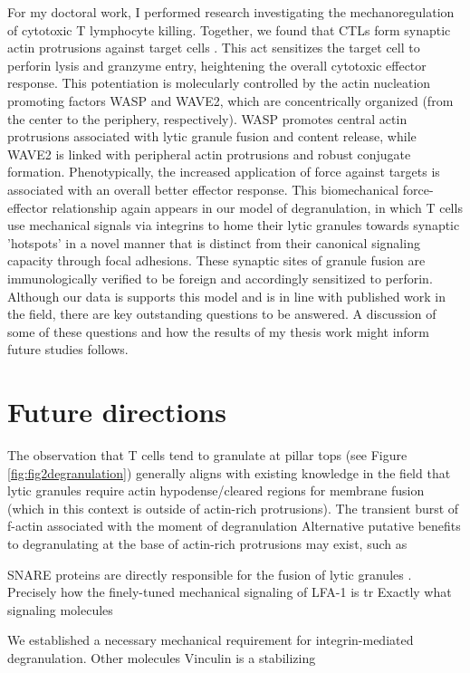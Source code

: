 For my doctoral work, I performed research investigating the mechanoregulation of cytotoxic T lymphocyte killing. Together, we found that CTLs form synaptic actin protrusions against target cells \cite{Tamzalit2018}. This act sensitizes the target cell to perforin lysis and granzyme entry, heightening the overall cytotoxic effector response. This potentiation is molecularly controlled by the actin nucleation promoting factors WASP and WAVE2, which are concentrically organized (from the center to the periphery, respectively). WASP promotes central actin protrusions associated with lytic granule fusion and content release, while WAVE2 is linked with peripheral actin protrusions and robust conjugate formation. Phenotypically, the increased application of force against targets is associated with an overall better effector response. This biomechanical force-effector relationship again appears in our model of degranulation, in which T cells use mechanical signals via integrins to home their lytic granules towards synaptic 'hotspots' in a novel manner that is distinct from their canonical signaling capacity through focal adhesions. These synaptic sites of granule fusion are immunologically verified to be foreign and accordingly sensitized to perforin. Although our data is supports this model and is in line with published work in the field, there are key outstanding questions to be answered. A discussion of some of these questions and how the results of my thesis work might inform future studies follows.

\section{Future directions} 

The observation that T cells tend to granulate at pillar tops (see Figure \ref{fig:fig2degranulation}) generally aligns with existing knowledge in the field that lytic granules require actin hypodense/cleared regions for membrane fusion (which in this context is outside of actin-rich protrusions). The transient burst of f-actin associated with the moment of degranulation  Alternative putative benefits to degranulating at the base of actin-rich protrusions may exist, such as 

SNARE proteins are directly responsible for the fusion of lytic granules \cite{Chang2017}. Precisely how the finely-tuned mechanical signaling of LFA-1 is tr Exactly what signaling molecules 

We established a necessary mechanical requirement for integrin-mediated degranulation. Other molecules Vinculin is a stabilizing 

